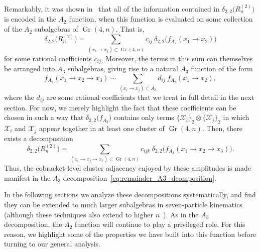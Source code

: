 \documentclass[11pt]{article}
\DeclareMathOperator{\Gr}{Gr}
\def\x{\mathcal{X}}
\begin{document}
Remarkably, it was shown in~\cite{Golden:2014xqa} that all of the information contained in $\delta_{2,2}\big(R^{(2)}_n\big)$ is encoded in the $A_2$ function, when this function is evaluated on some collection of the $A_2$ subalgebras of $\Gr(4,n)$. That is,
\begin{equation}
\delta_{2,2}\big( R_n^{(2)} \big) = \sum_{(x_i\to x_j) \subset \Gr(4,n)} c_{ij}\ \delta_{2,2} \big(f_{A_2}(x_1 \to x_2)\big)
\end{equation}
for some rational coefficients $c_{ij}$. Moreover, the terms in this sum can themselves be arranged into $A_3$ subalgebras, giving rise to a natural $A_3$ function of the form
\begin{equation}
f_{A_3}(x_1 \to x_2 \to x_3) \sim \sum_{(x_i\to x_j) \subset A_3} d_{ij}\ f_{A_2}(x_1 \to x_2),
\end{equation}
where the $d_{ij}$ are some rational coefficients that we treat in full detail in the next section. For now, we merely highlight the fact that these coefficients can be chosen in such a way that $\delta_{2,2}\big(f_{A_3} \big)$ contains only terms $\{\x_i\}_2 \otimes \{\x_j \}_2$ in which $\x_i$ and $\x_j$ appear together in at least one cluster of $\Gr(4,n)$. Then, there exists a decomposition
\begin{equation} \label{eq:remainder_A3_deomposition}
\delta_{2,2}\big( R_n^{(2)} \big) = \sum_{(x_i\to x_j \to x_k) \subset \Gr(4,n)} c_{ijk}\ \delta_{2,2} \big(f_{A_3}(x_1 \to x_2 \to x_3)\big).
\end{equation}
Thus, the cobracket-level cluster adjacency enjoyed by these amplitudes is made manifest in the $A_3$ decomposition~\eqref{eq:remainder_A3_deomposition}.

In the following sections we analyze these decompositions systematically, and find they can be extended to much larger subalgebras in seven-particle kinematics (although these techniques also extend to higher $n$~\cite{cluster_subalgebras_ii}). As in the $A_3$ decomposition, the $A_2$ function will continue to play a privileged role. For this reason, we highlight some of the properties we have built into this function before turning to our general analysis. 
\end{document}
